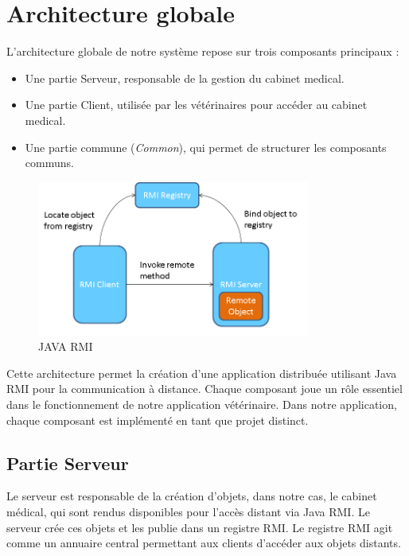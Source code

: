 \documentclass{article} %
\begin{document}
\newpage
\section{Architecture globale}

L'architecture globale de notre système repose sur trois composants principaux :
\begin{itemize}
    \item Une partie Serveur, responsable de la gestion du cabinet medical.
    \item Une partie Client, utilisée par les vétérinaires pour accéder au cabinet medical.
    \item Une partie commune (\textit{Common}), qui permet de structurer les composants communs.
\end{itemize}

\begin{figure}[h]
    \centering
    \includegraphics[width=0.8\textwidth]{rmi}
    \caption{JAVA RMI}
    \label{fig:schema-rmi}
\end{figure}

Cette architecture permet la création d'une application distribuée utilisant Java RMI 
pour la communication à distance. Chaque composant joue un rôle essentiel dans le fonctionnement 
de notre application vétérinaire.
Dans notre application, chaque composant est implémenté en tant que projet distinct.

\subsection{Partie Serveur}

Le serveur est responsable de la création d'objets, dans notre cas, le cabinet médical, 
qui sont rendus disponibles pour l'accès distant via Java RMI. 
Le serveur crée ces objets et les publie dans un registre RMI. 
Le registre RMI agit comme un annuaire central permettant aux clients d'accéder aux objets distants.
\end{document}
